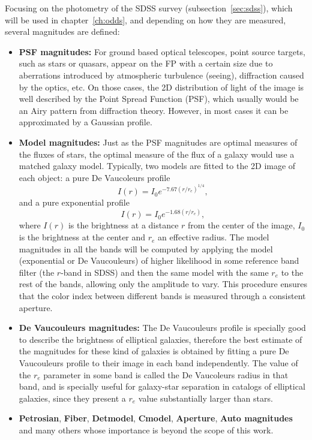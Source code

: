 Focusing on the photometry of the SDSS survey (subsection~\ref{sec:sdss}), which will be used in chapter~\ref{ch:odds}, and depending on how they are measured, several magnitudes are defined:
\begin{itemize}

\item \textbf{PSF magnitudes:} For ground based optical telescopes, point source targets, such as stars or quasars, appear on the FP with a certain size due to aberrations introduced by atmospheric turbulence (seeing), diffraction caused by the optics, etc. On those cases, the 2D distribution of light of the image is well described by the Point Spread Function (PSF), which usually would be an Airy pattern from diffraction theory. However, in most cases it can be approximated by a Gaussian profile.

\item \textbf{Model magnitudes:} Just as the PSF magnitudes are optimal measures of the fluxes of stars, the optimal measure of the flux of a galaxy would use a matched galaxy model. Typically, two models are fitted to the 2D image of each object: a pure De Vaucoleurs profile~\citep{vaucouleurs48}
\begin{equation}
I(r)=I_0 e^{-7.67({r/r_e})^{1/4}},
\end{equation}
and a pure exponential profile 
\begin{equation}
I(r)=I_0 e^{-1.68(r/r_e)},
\end{equation}
where $I(r)$ is the brightness at a distance $r$ from the center of the image, $I_0$ is the brightness at the center and $r_e$ an effective radius. The model magnitudes in all the bands will be computed by applying the model (exponential or De Vaucouleurs) of higher likelihood in some reference band filter (the $r$-band in SDSS) and then the same model with the same $r_e$ to the rest of the bands, allowing only the amplitude to vary. This procedure ensures that the color index between different bands is measured through a consistent aperture.

\item \textbf{De Vaucouleurs magnitudes:} The De Vaucouleurs profile is specially good to describe the brightness of elliptical galaxies, therefore the best estimate of the magnitudes for these kind of galaxies is obtained by fitting a pure De Vaucouleurs profile to their image in each band independently. The value of the $r_e$ parameter in some band is called the De Vaucoleurs radius in that band, and is specially useful for galaxy-star separation in catalogs of elliptical galaxies, since they present a $r_e$ value substantially larger than stars. 

\item \textbf{Petrosian}, \textbf{Fiber}, \textbf{Detmodel}, \textbf{Cmodel}, \textbf{Aperture}, \textbf{Auto magnitudes} and many others whose importance is beyond the scope of this work. 

\end{itemize}


